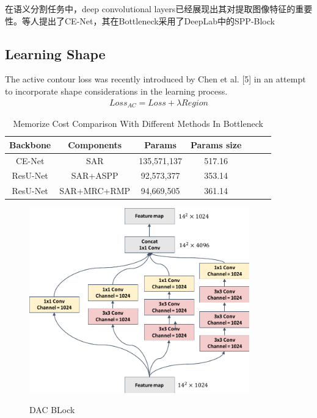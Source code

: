 \documentclass[UTF8]{article} %
\begin{document}
在语义分割任务中，deep convolutional layers已经展现出其对提取图像特征的重要性。等人提出了CE-Net\cite{cenet}，其在Bottleneck采用了DeepLab中的SPP-Block


\subsection{Learning Shape}

The active contour loss was recently introduced by Chen et al. [5] in an attempt to incorporate shape considerations in the learning process.
\begin{align}
Loss_{AC} = Loss + \lambda Region
\end{align}


\begin{table}[htbp]
  \vspace{-2mm}
  \begin{center}\small
  \label{param-table}
  \begin{tabular}{ccccccc}
    
  \toprule
  Backbone & Components & Params & Params size \\
  \midrule
    CE-Net & SAR & 135,571,137 & 517.16 \\
    ResU-Net & SAR+ASPP    & 92,573,377 & 353.14  \\
    ResU-Net & SAR+MRC+RMP & 94,669,505 & 361.14  \\
\bottomrule    
  \end{tabular}
  \caption{Memorize Cost Comparison With Different Methods In Bottleneck}
\end{center}
  \vspace{-4mm}
\end{table}

\begin{figure}[H]
\small
\centering
\includegraphics[width=0.85\textwidth]{dac_block}
\label{fig:dac_block}
\caption{DAC BLock}
\end{figure}
\end{document}
